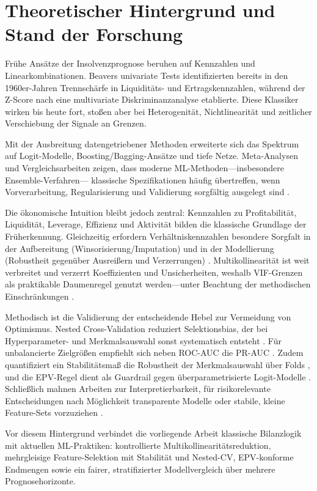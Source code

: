 \chapter{Theoretischer Hintergrund und Stand der Forschung}

Frühe Ansätze der Insolvenzprognose beruhen auf Kennzahlen und Linearkombinationen. 
Beavers univariate Tests identifizierten bereits in den 1960er-Jahren Trennschärfe in Liquiditäts- und Ertragskennzahlen, während der Z-Score nach \textcite{altman1968financial} eine multivariate 
Diskriminanzanalyse etablierte. Diese Klassiker wirken bis heute fort, stoßen aber bei 
Heterogenität, Nichtlinearität und zeitlicher Verschiebung der Signale an Grenzen.

Mit der Ausbreitung datengetriebener Methoden erweiterte sich das Spektrum auf 
Logit-Modelle, Boosting/Bagging-Ansätze und tiefe Netze. Meta-Analysen und 
Vergleichsarbeiten zeigen, dass moderne ML-Methoden—insbesondere Ensemble-Verfahren—
klassische Spezifikationen häufig übertreffen, wenn Vorverarbeitung, Regularisierung 
und Validierung sorgfältig ausgelegt sind \parencite{barboza2017machine,sun2024bankruptcy,hastieelementsstatistical2009}.

Die ökonomische Intuition bleibt jedoch zentral: Kennzahlen zu Profitabilität, Liquidität, 
Leverage, Effizienz und Aktivität bilden die klassische Grundlage der Früherkennung. 
Gleichzeitig erfordern Verhältniskennzahlen besondere Sorgfalt in der Aufbereitung 
(Winsorisierung/Imputation) und in der Modellierung (Robustheit gegenüber Ausreißern 
und Verzerrungen) \parencite{vonhippel2013passive,vanbuuren2018fimd}. Multikollinearität ist 
weit verbreitet und verzerrt Koeffizienten und Unsicherheiten, weshalb VIF-Grenzen als 
praktikable Daumenregel genutzt werden—unter Beachtung der methodischen Einschränkungen \parencite{obrien2007caution,pennstate2024vif}.

Methodisch ist die Validierung der entscheidende Hebel zur Vermeidung von Optimismus. 
Nested Cross-Validation reduziert Selektionsbias, der bei Hyperparameter- und 
Merkmalsauswahl sonst systematisch entsteht \parencite{cawley2010overfitting,varma2006bias}. 
Für unbalancierte Zielgrößen empfiehlt sich neben ROC-AUC die PR-AUC \parencite{saito2015precision}. 
Zudem quantifiziert ein Stabilitätsmaß die Robustheit der Merkmalsauswahl über Folds 
\parencite{nogueira2018stability}, und die 
EPV-Regel dient als Guardrail gegen überparametrisierte Logit-Modelle \parencite{peduzzi1996epv,steyerberg2019clinical}. 
Schließlich mahnen Arbeiten zur Interpretierbarkeit, für risikorelevante Entscheidungen 
nach Möglichkeit transparente Modelle oder stabile, kleine Feature-Sets vorzuziehen \parencite{rudin2019stop}.

Vor diesem Hintergrund verbindet die vorliegende Arbeit klassische Bilanzlogik mit 
aktuellen ML-Praktiken: kontrollierte Multikollinearitätsreduktion, 
mehrgleisige Feature-Selektion mit Stabilität und Nested-CV, EPV-konforme 
Endmengen sowie ein fairer, stratifizierter Modellvergleich über mehrere 
Prognosehorizonte.
